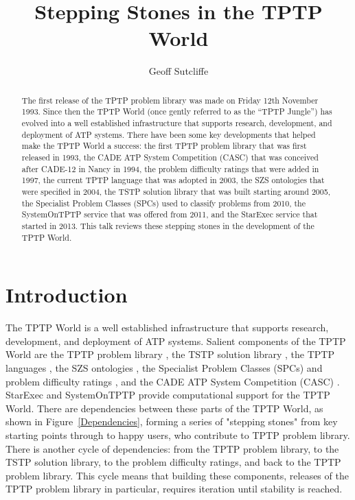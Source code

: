 \documentclass{easychair}
\title{Stepping Stones in the TPTP World}
\author{
  Geoff Sutcliffe
}
\institute{
  University of Miami,
  Miami, USA\\
  \email{geoff@cs.miami.edu}\\
}
\begin{document}
\maketitle

\begin{abstract}
The first release of the TPTP problem library was made on Friday 12th November 1993. 
Since then the TPTP World (once gently referred to as the ``TPTP Jungle'') has evolved into a 
well established infrastructure that supports research, development, and deployment of ATP systems.
There have been some key developments that helped make the TPTP World a success: 
the first TPTP problem library that was first released in 1993, 
the CADE ATP System Competition (CASC) that was conceived after CADE-12 in Nancy in 1994, 
the problem difficulty ratings that were added in 1997, 
the current TPTP language that was adopted in 2003, 
the SZS ontologies that were specified in 2004, 
the TSTP solution library that was built starting around 2005, 
the Specialist Problem Classes (SPCs) used to classify problems from 2010, 
the SystemOnTPTP service that was offered from 2011, 
and 
the StarExec service that started in 2013. 
This talk reviews these stepping stones in the development of the TPTP World.
\end{abstract}
\section{Introduction}
\label{Introduction}

The TPTP World \cite{Sut10,Sut17} is a well established infrastructure that supports research, 
development, and deployment of ATP systems.
Salient components of the TPTP World are
the TPTP problem library \cite{Sut09}, 
the TSTP solution library \cite{Sut10}, 
the TPTP languages \cite{SS+06}, 
the SZS ontologies \cite{Sut08-KEAPPA},
the Specialist Problem Classes (SPCs) and problem difficulty ratings \cite{SS01},
and the CADE ATP System Competition (CASC) \cite{Sut16}.
StarExec \cite{SST14} and SystemOnTPTP \cite{Sut00-CADE-17} provide computational support for
the TPTP World.
There are dependencies between these parts of the TPTP World, as shown in 
Figure~\ref{Dependencies}, forming a series of "stepping stones" from key starting points
through to happy users, who contribute to TPTP problem library.
There is another cycle of dependencies: from the TPTP problem library, to the TSTP solution 
library, to the problem difficulty ratings, and back to the TPTP problem library.
This cycle means that building these components, releases of the TPTP problem library in
particular, requires iteration until stability is reached.
\end{document}
